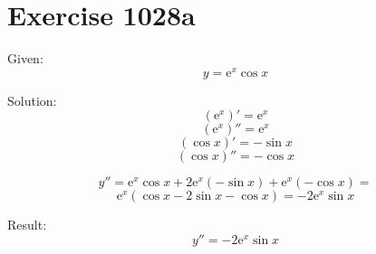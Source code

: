 \documentclass[a4paper, 10pt]{scrartcl}
\newcommand*\euler{\mathrm{e}}
\begin{document}
\section{Exercise 1028a}

Given:
\[
y = \euler^{x}\cos{x}
\]

Solution:
\[
(\euler^{x})' = \euler^{x}
\]
\[
(\euler^{x})'' = \euler^{x}
\]
\[
(\cos{x})' = -\sin{x}
\]
\[
(\cos{x})'' = -\cos{x}
\]

\[
y'' = \euler^{x}\cos{x} + 2\euler^{x}(-\sin{x}) + \euler^{x}(-\cos{x}) =
\]
\[
\euler^{x}(\cos{x} - 2\sin{x} - \cos{x}) = -2\euler^{x}\sin{x}
\]

Result:
\[
y'' = -2\euler^{x}\sin{x}
\]
\end{document}
